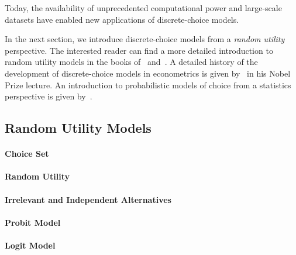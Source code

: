 
Today, the availability of unprecedented computational power and large-scale datasets have enabled new applications of discrete-choice models.

In the next section, we introduce discrete-choice models from a \emph{random utility} perspective.
The interested reader can find a more detailed introduction to random utility models in the books of~\citet[Chapter~1]{train2009discrete} and~\citet[Chapter~3]{hensher2005applied}.
A detailed history of the development of discrete-choice models in econometrics is given by~\citet{mcfadden2001economic} in his Nobel Prize lecture.
An introduction to probabilistic models of choice from a statistics perspective is given by~\citet[Chapter~1]{maystre2018efficient}.

\subsection{Random Utility Models}

\paragraph{Choice Set}

\paragraph{Random Utility}

\paragraph{Irrelevant and Independent Alternatives}

\paragraph{Probit Model}

\paragraph{Logit Model}

